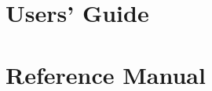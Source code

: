 \documentclass[]{report}
\begin{document}

\part{Users' Guide}


\part{Reference Manual}









\end{document}
